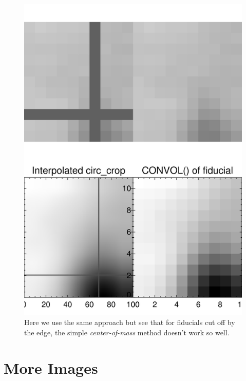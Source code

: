 \documentclass[10pt]{article}
\begin{document}
\begin{figure}[ht]
\begin{minipage}{.45\textwidth}
            \centering
                \includegraphics[width=\linewidth]{plots_tables_images/cropcomp1.png}
                \caption{Here we use the same approach but see that for fiducials cut off by the edge, the simple \emph{center-of-mass} method doesn't work so well.}
        \end{minipage}
    \end{figure}

\newpage

\section{More Images}    
\end{document}
